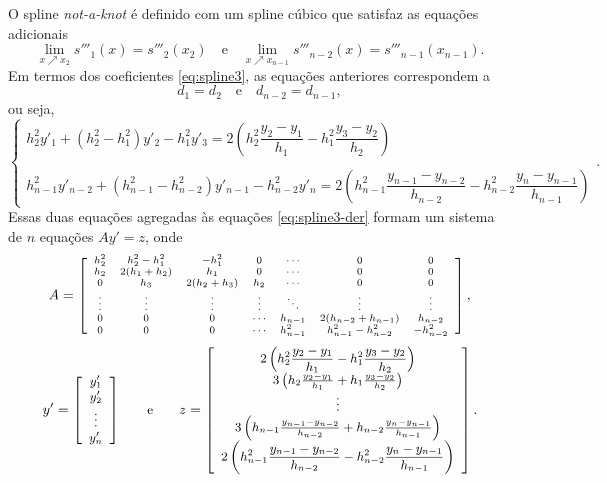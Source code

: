 O spline \textit{not-a-knot} é definido com um spline cúbico que satisfaz as equações adicionais
\begin{equation}
	\lim\limits_{x\nearrow x_2 }s'''_1(x)=s'''_2(x_2)\quad\text{e}\quad	\lim\limits_{x\nearrow x_{n-1} }s'''_{n-2}(x)=s'''_{n-1}(x_{n-1}).
\end{equation}
Em termos dos coeficientes \eqref{eq:spline3}, as equações anteriores correspondem a
\begin{equation}
	d_1=d_2\quad\text{e}\quad d_{n-2}=d_{n-1},
\end{equation}
ou seja,
\begin{equation}
\left\{\begin{array}{l}
	h_2^2y'_1+(h_2^2-h_1^2)y'_2-h_1^2y'_3=2\left(h_2^2\dfrac{y_2-y_1}{h_1}-h_1^2\dfrac{y_3-y_2}{h_2}\right)\\
	\\
	h_{n-1}^2y'_{n-2}+(h_{n-1}^2-h_{n-2}^2)y'_{n-1}-h_{n-2}^2y'_n=2\left(h_{n-1}^2\dfrac{y_{n-1}-y_{n-2}}{h_{n-2}}-h_{n-2}^2\dfrac{y_n-y_{n-1}}{h_{n-1}}\right)
	\end{array}\right..
\end{equation}
Essas duas equações agregadas às equações \eqref{eq:spline3-der} formam um sistema de $n$ equações $Ay' = z$, onde
\begin{equation}
	\begin{scriptsize}
		A=\left[\begin{array}{ccccccc}
			h_2^2&h_2^2-h_1^2&-h_1^2&0&\cdots&0&0\\
			h_2&2(h_1+h_2)&h_1&0&\cdots&0&0\\
			0&h_3&2(h_2+h_3)&h_2&\cdots&0&0\\
			\vdots&\vdots&\vdots&\vdots&\ddots&\vdots&\vdots\\
			0&0&0&\cdots&h_{n-1} & 2(h_{n-2}+h_{n-1})&h_{n-2}\\
			0&0&0&\cdots &h_{n-1}^2&h_{n-1}^2-h_{n-2}^2&-h_{n-2}^2
		\end{array}\right],
	\end{scriptsize}
\end{equation}
\begin{equation}
	\begin{small}
		y'= \left[\begin{array}{c}
			y'_1\\
			y'_2\\
			\vdots\\
			y'_n
		\end{array}\right]\qquad \text{e}\qquad
		z = \left[\begin{array}{c}
			2\left(h_2^2\dfrac{y_2-y_1}{h_1}-h_1^2\dfrac{y_3-y_2}{h_2}\right)\\
			3\left(h_2\frac{y_2-y_1}{h_1}+h_1\frac{y_3-y_2}{h_2}\right)\\
			\vdots\\
			3\left(h_{n-1}\frac{y_{n-1}-y_{n-2}}{h_{n-2}}+h_{n-2}\frac{y_n-y_{n-1}}{h_{n-1}}\right)\\
			2\left(h_{n-1}^2\dfrac{y_{n-1}-y_{n-2}}{h_{n-2}}-h_{n-2}^2\dfrac{y_n-y_{n-1}}{h_{n-1}}\right)\\
		\end{array}\right].
	\end{small}
\end{equation}
